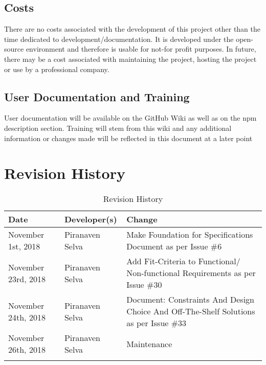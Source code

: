 \documentclass{article}
\begin{document}
\subsection{Costs}

There are no costs associated with the development of this project other than the time dedicated to development/documentation. It is developed under the open-source environment and therefore is usable for not-for profit purposes. In future, there may be a cost associated with maintaining the project, hosting the project or use by a professional company. 

\subsection{User Documentation and Training}

User documentation will be available on the GitHub Wiki as well as on the npm description section. 
\newline
Training will stem from this wiki and any additional information or changes made will be reflected in this document at a later point


\newpage
\section{Revision History}
\begin{table}[hp]
\caption{Revision History} \label{TblRevisionHistory}
\begin{tabularx}{\textwidth}{llX}
\toprule
\textbf{Date} & \textbf{Developer(s)} & \textbf{Change}\\
\midrule
November 1st, 2018 & Piranaven Selva & Make Foundation for Specifications Document as per Issue \#6 \\
November 23rd, 2018 & Piranaven Selva & Add Fit-Criteria to Functional/ Non-functional Requirements as per Issue \#30 \\
November 24th, 2018 & Piranaven Selva & Document: Constraints And Design Choice And Off-The-Shelf Solutions as per Issue \#33 \\
November 26th, 2018 & Piranaven Selva & Maintenance  \\
\\
\bottomrule
\end{tabularx}
\end{table}


\end{document}
